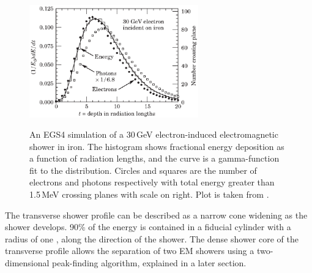 
\begin{figure}[tbph]
\centering
{\includegraphics[width=0.65\textwidth]{photon/EMlong}}
\caption[Simulated longitudinal electromagnetic shower profile as a function of depth for electrons and photons.]
{An EGS4 simulation of a 30\,GeV electron-induced electromagnetic shower in iron. The histogram shows fractional energy deposition as a function of radiation lengths, and the curve is a gamma-function fit to the distribution. Circles and squares are the number of electrons and photons respectively with total energy greater than 1.5\,MeV crossing planes with scale on right. Plot is taken from \cite{Agashe:2014kda}.}
\label{fig:photonEMlongProfile}
\end{figure}

The transverse shower profile can be described as  a narrow cone widening as the shower develops. 90\% of the energy  is contained in a fiducial cylinder with a radius of one \RM, along the direction of the shower. The dense shower core of the transverse profile allows the separation of two EM showers using a two-dimensional peak-finding algorithm, explained in a later section.





